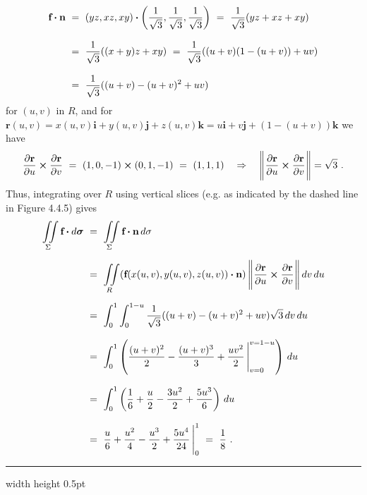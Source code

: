 \begin{exmp}
 \begin{align*}
  \textbf{f} \bm{\cdot} \textbf{n} ~&=~
   (yz,xz,xy) \bm{\cdot} \left( \frac{1}{\sqrt{3}},\frac{1}{\sqrt{3}},\frac{1}{\sqrt{3}} \right)
   ~=~ \frac{1}{\sqrt{3}}(yz+xz+xy)\\[8pt]
   &=~ \frac{1}{\sqrt{3}}((x+y)z+xy)
   ~=~ \frac{1}{\sqrt{3}}((u+v)(1-(u+v))+uv)\\[8pt]
   &=~ \frac{1}{\sqrt{3}}((u+v)- (u+v)^2 + uv)
 \end{align*}
 for $(u,v)$ in $R$, and for $\textbf{r}(u,v)=x(u,v)\textbf{i} + y(u,v)\textbf{j} + z(u,v)\textbf{k} = u\textbf{i} +
 v\textbf{j} + (1-(u+v))\textbf{k}$ we have
 \begin{displaymath}
  \frac{\partial \textbf{r}}{\partial u} \bm{\times} \frac{\partial \textbf{r}}{\partial v} ~=~
   (1,0,-1) \bm{\times} (0,1,-1) ~=~ (1,1,1) \quad\Rightarrow\quad
   \Biggl\lVert\mspace{1mu}\frac{\partial \textbf{r}}{\partial u} \bm{\times} \frac{\partial \textbf{r}}{\partial v}\mspace{1mu}\Biggr\rVert = \sqrt{3}~.
 \end{displaymath}
 Thus, integrating over $R$ using vertical slices (e.g. as indicated by the dashed line in Figure 4.4.5) gives
 \begin{align*}
  \iint\limits_{\Sigma} \textbf{f} \bm{\cdot} d\bm{\sigma} ~&=~
   \iint\limits_{\Sigma} \textbf{f} \bm{\cdot} \textbf{n}\,d\sigma\\[6pt]
   &=~ \iint\limits_{R} (\textbf{f}(x(u,v),y(u,v),z(u,v)) \bm{\cdot} \textbf{n})\,
    \Biggl\lVert\mspace{1mu}\frac{\partial \textbf{r}}{\partial u} \bm{\times} \frac{\partial \textbf{r}}{\partial v}\mspace{1mu}\Biggr\rVert\,dv\,du\\[6pt]
   &=~ \int_0^1 \int_0^{1-u} \frac{1}{\sqrt{3}}((u+v)- (u+v)^2 + uv) \sqrt{3}\,dv\,du\\[8pt]
   &=~ \int_0^1 \left( \frac{(u+v)^2}{2} - \frac{(u+v)^3}{3} + \frac{uv^2}{2}\,\Bigg|_{v=0}^{v=1-u} \right)\,du\\[8pt]
   &=~ \int_0^1 \left( \frac{1}{6} + \frac{u}{2} - \frac{3u^2}{2} + \frac{5u^3}{6} \right)\,du\\[8pt]
   &=~ \frac{u}{6} + \frac{u^2}{4} - \frac{u^3}{2} + \frac{5u^4}{24}\,\Bigg|_0^1 ~=~ \frac{1}{8}~.
 \end{align*}
\end{exmp}
\hrule width \textwidth height 0.5pt
\vspace{3mm}

